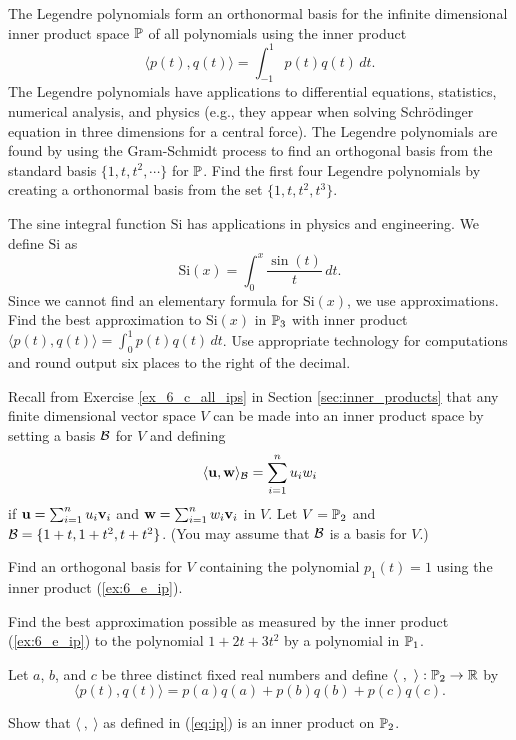 \item The Legendre polynomials form an orthonormal basis for the infinite dimensional inner product space $\mathbb{P}$ of all polynomials using the inner product 
\[\langle p(t), q(t) \rangle = \int_{-1}^{1} p(t) q(t) \, dt.\] 
The Legendre polynomials have applications to differential equations, statistics, numerical analysis, and physics (e.g., they appear when solving Schr\"odinger equation in three dimensions for a central force). The Legendre polynomials are found by using the Gram-Schmidt process to find an orthogonal basis from the standard basis $\{1, t, t^2, \cdots\}$ for $\mathbb{P}$. Find the first four Legendre polynomials by creating a orthonormal basis from the set $\{1,t,t^2, t^3\}$. 

\newcommand{\Si}{\text{Si}} 
\item The sine integral function $\Si$ has applications in physics and engineering. We define $\Si$ as
\[\Si(x) = \int_0^x \frac{\sin(t)}{t} \, dt.\]
Since we cannot find an elementary formula for $\Si(x)$, we use approximations. Find the best approximation to $\Si(x)$ in $\mathbb{P}_3$ with inner product $\langle p(t), q(t) \rangle = \int_0^1 p(t)q(t) \, dt$. Use appropriate technology for computations and round output six places to the right of the decimal.

\item Recall from Exercise \ref{ex_6_c_all_ips} in Section \ref{sec:inner_products} that any finite dimensional vector space $V$ can be made into an inner product space by setting a basis $\mathcal{B}$ for $V$ and defining
\begin{equation} \label{ex:6_e_ip}
\langle \mathbf{u}, \mathbf{w} \rangle_{\mathcal{B}} = \sum_{i=1}^n u_iw_i 
\end{equation} 
if $\mathbf{u} = \sum_{i=1}^n u_i \mathbf{v}_i$ and $\mathbf{w} = \sum_{i=1}^n w_i \mathbf{v}_i$ in $V$. Let  $V = \mathbb{P}_2$ and $\mathcal{B} = \{1+t, 1+t^2, t+t^2\}$. (You may assume that $\mathcal{B}$ is a basis for $V$.)
\ba
	\item Find an orthogonal basis for $V$ containing the polynomial $p_1(t) = 1$ using the inner product (\ref{ex:6_e_ip}). 
 
 \item Find the best approximation possible as measured by the inner product (\ref{ex:6_e_ip}) to the polynomial $1 + 2t + 3t^2$ by a polynomial in $\mathbb{P}_1$.
	 
 \ea

\item Let $a$, $b$, and $c$ be three distinct fixed real numbers and define $\langle \ , \ \rangle : \mathbb{P}_2 \to \mathbb{R}$ by
 \begin{equation} \label{eq:ip}
 \langle p(t),q(t) \rangle = p(a)q(a) + p(b)q(b) + p(c)q(c).
 \end{equation}
 \ba
 \item Show that $\langle \ , \ \rangle$ as defined in (\ref{eq:ip}) is an inner product on $\mathbb{P}_2$.
 
